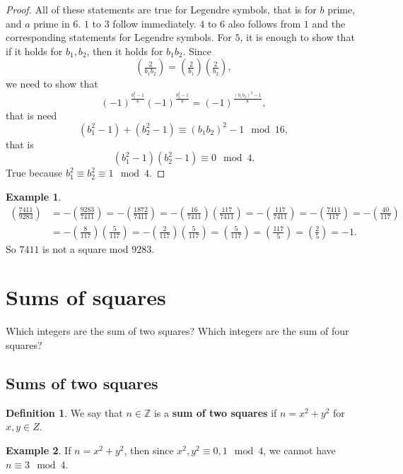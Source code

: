 \documentclass{article}
\newcommand{\Z}{\mathbb{Z}}
\newcommand{\rb}[1]{\left( #1 \right)}
\newcommand{\legendre}[2]{\rb{\tfrac{#1}{#2}}}
\theoremstyle{definition}\newtheorem{definition}{Definition}
\theoremstyle{definition}\newtheorem{remark}[definition]{Remark}
\theoremstyle{definition}\newtheorem*{example}{Example}
\theoremstyle{definition}\newtheorem*{note}{Note}
\begin{document}
\begin{proof}
All of these statements are true for Legendre symbols, that is for $ b $ prime, and $ a $ prime in $ 6 $. $ 1 $ to $ 3 $ follow immediately. $ 4 $ to $ 6 $ also follows from $ 1 $ and the corresponding statements for Legendre symbols. For $ 5 $, it is enough to show that if it holds for $ b_1, b_2 $, then it holds for $ b_1b_2 $. Since
$$ \legendre{2}{b_1b_2} = \legendre{2}{b_1}\legendre{2}{b_2}, $$
we need to show that
$$ \rb{-1}^{\tfrac{b_1^2 - 1}{8}}\rb{-1}^{\tfrac{b_2^2 - 1}{8}} = \rb{-1}^{\tfrac{\rb{b_1b_2}^2 - 1}{8}}, $$
that is need
$$ \rb{b_1^2 - 1} + \rb{b_2^2 - 1} \equiv \rb{b_1b_2}^2 - 1 \mod 16, $$
that is
$$ \rb{b_1^2 - 1}\rb{b_2^2 - 1} \equiv 0 \mod 4. $$
True because $ b_1^2 \equiv b_2^2 \equiv 1 \mod 4 $.
\end{proof}

\begin{example}
\begin{align*}
\legendre{7411}{9283}
& = -\legendre{9283}{7411} = -\legendre{1872}{7411} = -\legendre{16}{7411}\legendre{117}{7411} = -\legendre{117}{7411} = -\legendre{7411}{117} = -\legendre{40}{117} \\
& = -\legendre{8}{117}\legendre{5}{117} = -\legendre{2}{117}\legendre{5}{117} = \legendre{5}{117} = \legendre{117}{5} = \legendre{2}{5} = -1.
\end{align*}
So $ 7411 $ is not a square mod $ 9283 $.
\end{example}

\pagebreak

\section{Sums of squares}

Which integers are the sum of two squares? Which integers are the sum of four squares?

\subsection{Sums of two squares}

\begin{definition}
We say that $ n \in \Z $ is a \textbf{sum of two squares} if $ n = x^2 + y^2 $ for $ x, y \in Z $.
\end{definition}

\begin{example}
If $ n = x^2 + y^2 $, then since $ x^2, y^2 \equiv 0, 1 \mod 4 $, we cannot have $ n \equiv 3 \mod 4 $.
\end{example}
\end{document}
